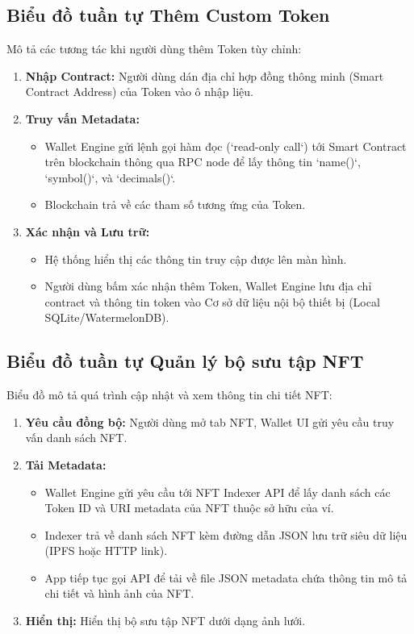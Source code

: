 \documentclass[a4paper]{report}
\begin{document}
\subsection{Biểu đồ tuần tự Thêm Custom Token}


Mô tả các tương tác khi người dùng thêm Token tùy chỉnh:
\begin{enumerate}
    \item \textbf{Nhập Contract:} Người dùng dán địa chỉ hợp đồng thông minh (Smart Contract Address) của Token vào ô nhập liệu.
    \item \textbf{Truy vấn Metadata:}
    \begin{itemize}
        \item Wallet Engine gửi lệnh gọi hàm đọc (`read-only call`) tới Smart Contract trên blockchain thông qua RPC node để lấy thông tin `name()`, `symbol()`, và `decimals()`.
        \item Blockchain trả về các tham số tương ứng của Token.
    \end{itemize}
    \item \textbf{Xác nhận và Lưu trữ:}
    \begin{itemize}
        \item Hệ thống hiển thị các thông tin truy cập được lên màn hình.
        \item Người dùng bấm xác nhận thêm Token, Wallet Engine lưu địa chỉ contract và thông tin token vào Cơ sở dữ liệu nội bộ thiết bị (Local SQLite/WatermelonDB).
    \end{itemize}
\end{enumerate}

\subsection{Biểu đồ tuần tự Quản lý bộ sưu tập NFT}


Biểu đồ mô tả quá trình cập nhật và xem thông tin chi tiết NFT:
\begin{enumerate}
    \item \textbf{Yêu cầu đồng bộ:} Người dùng mở tab NFT, Wallet UI gửi yêu cầu truy vấn danh sách NFT.
    \item \textbf{Tải Metadata:}
    \begin{itemize}
        \item Wallet Engine gửi yêu cầu tới NFT Indexer API để lấy danh sách các Token ID và URI metadata của NFT thuộc sở hữu của ví.
        \item Indexer trả về danh sách NFT kèm đường dẫn JSON lưu trữ siêu dữ liệu (IPFS hoặc HTTP link).
        \item App tiếp tục gọi API để tải về file JSON metadata chứa thông tin mô tả chi tiết và hình ảnh của NFT.
    \end{itemize}
    \item \textbf{Hiển thị:} Hiển thị bộ sưu tập NFT dưới dạng ảnh lưới.
\end{enumerate}
\end{document}
